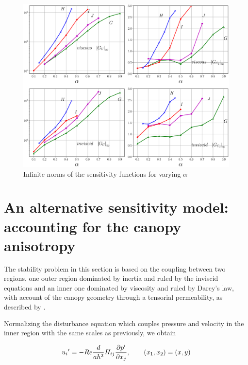 \begin{figure}[t!]
	\centering
	\includegraphics[width=1\linewidth]{chapter_3/figure/5}
	\caption{Infinite norms of the sensitivity functions for varying $\alpha$}
	\label{fig:5}
\end{figure}


\section{An alternative sensitivity model: accounting for the canopy anisotropy}
\label{sec:4}

The stability problem in this section is based on the coupling between two regions, one outer
region dominated by inertia and ruled by the inviscid equations and an inner one dominated by
viscosity and ruled by Darcy’s law, with account of the canopy geometry through a tensorial
permeability, as described by \citet{zampogna2016instability}. 

\newpage
Normalizing the disturbance equation which couples
pressure and velocity in the inner region with the same scales as previously, we obtain

\begin{equation}
{u_i}' = -Re \dfrac{d}{ah^2} {H}_{ij} \dfrac{\partial p'}{\partial x_j},  \qquad (x_1, x_2) = (x,y)
\label{eq:darcy}
\end{equation}


